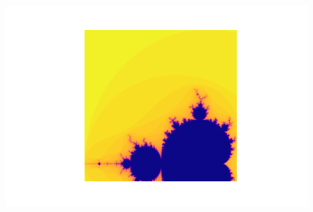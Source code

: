 \documentclass{article}
\begin{document}
\includegraphics[width=\textwidth]{mandelbrot2.png}
\newpage
\end{document}
